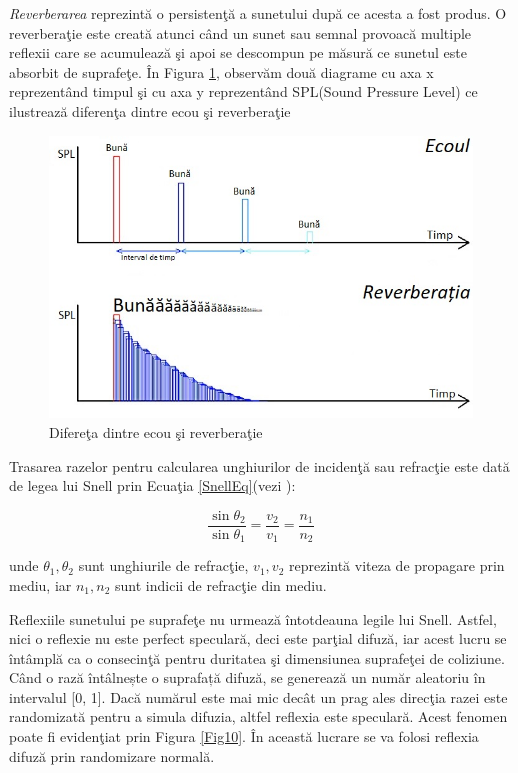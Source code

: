 	{\it{Reverberarea}} reprezint\u{a} o persisten\c{t}\u{a} a sunetului dup\u{a} ce acesta a fost produs. O reverbera\c{t}ie este creat\u{a} atunci c\^{a}nd un sunet sau semnal provoac\u{a} multiple reflexii care se acumuleaz\u{a} \c{s}i apoi se descompun pe m\u{a}sur\u{a} ce sunetul este absorbit de suprafe\c{t}e. \^{I}n Figura \ref{Fig2}, observ\u{a}m dou\u{a} diagrame cu axa x reprezent\^{a}nd timpul \c{s}i cu axa y reprezent\^{a}nd SPL(Sound Pressure Level) ce ilustreaz\u{a} diferen\c{t}a dintre ecou \c{s}i reverbera\c{t}ie 
	
	\begin{figure}[!htb]
		\centering
		\includegraphics[width=12cm]{imagini/EchoReverberation.jpg}
		\caption{Difere\c{t}a dintre ecou \c{s}i reverbera\c{t}ie}
		\label{Fig2}
	\end{figure}

	Trasarea razelor pentru calcularea unghiurilor de inciden\c{t}\u{a} sau refrac\c{t}ie este dat\u{a} de legea lui Snell prin Ecua\c{t}ia \eqref{SnellEq}(vezi \cite{snell}):
	
	\begin{equation}
		\label{SnellEq}
		\frac{\sin \theta_2}{\sin \theta_1} = \frac{v_2}{v_1} = \frac{n_1}{n_2}
	\end{equation}

	\noindent unde $\theta_1, \theta_2$ sunt unghiurile de refrac\c{t}ie, $v_1, v_2$ reprezint\u{a} viteza de propagare prin mediu, iar $n_1, n_2$ sunt indicii de refrac\c{t}ie din mediu.
	\bigskip

	Reflexiile sunetului pe suprafe\c{t}e nu urmeaz\u{a} \^{i}ntotdeauna legile lui Snell. Astfel, nici o reflexie nu este perfect specular\u{a}, deci este par\c{t}ial difuz\u{a}, iar acest lucru se \^{i}nt\^{a}mpl\u{a} ca o consecin\c{t}\u{a} pentru duritatea \c{s}i dimensiunea suprafe\c{t}ei de coliziune. Când o rază întâlnește o
	suprafață difuză, se generează un număr aleatoriu în intervalul [0, 1]. Dac\u{a} num\u{a}rul este mai mic dec\^{a}t un prag ales direc\c{t}ia razei este randomizat\u{a} pentru a simula difuzia, altfel	reflexia este specular\u{a}. Acest fenomen poate fi eviden\c{t}iat prin Figura \ref{Fig10}. \^{I}n aceast\u{a} lucrare se va folosi reflexia difuz\u{a} prin randomizare normal\u{a}.
	
